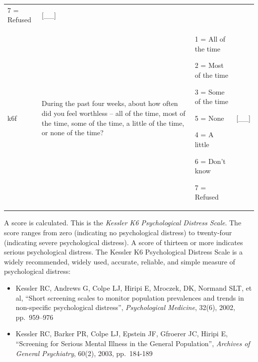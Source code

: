 \documentclass[12pt,a4paper]{book}
\theoremstyle{definition}
\theoremstyle{definition}
\theoremstyle{definition}
\theoremstyle{remark}
\begin{document}
\begin{longtable}[]{@{}llll@{}}
\begin{minipage}[t]{0.24\columnwidth}
7 = Refused\strut
\end{minipage} & \begin{minipage}[t]{0.24\columnwidth}\raggedright
{[}\_\_{]}\strut
\end{minipage}\tabularnewline
\begin{minipage}[t]{0.24\columnwidth}\raggedright
k6f\strut
\end{minipage} & \begin{minipage}[t]{0.24\columnwidth}\raggedright
During the past four weeks, about how often did you feel worthless --
all of the time, most of the time, some of the time, a little of the
time, or none of the time?\strut
\end{minipage} & \begin{minipage}[t]{0.24\columnwidth}\raggedright
1 = All of the time

2 = Most of the time

3 = Some of the time

5 = None

4 = A little

6 = Don't know

7 = Refused\strut
\end{minipage} & \begin{minipage}[t]{0.24\columnwidth}\raggedright
{[}\_\_{]}\strut
\end{minipage}\tabularnewline
\bottomrule
\end{longtable}

A score is calculated. This is the \emph{Kessler K6 Psychological
Distress Scale}. The score ranges from zero (indicating no psychological
distress) to twenty-four (indicating severe psychological distress). A
score of thirteen or more indicates serious psychological distress. The
Kessler K6 Psychological Distress Scale is a widely recommended, widely
used, accurate, reliable, and simple measure of psychological distress:

\begin{itemize}
\item
  Kessler RC, Andrews G, Colpe LJ, Hiripi E, Mroczek, DK, Normand SLT,
  et al, ``Short screening scales to monitor population prevalences and
  trends in non-specific psychological distress'', \emph{Psychological
  Medicine}, 32(6), 2002, pp.~959--976
\item
  Kessler RC, Barker PR, Colpe LJ, Epstein JF, Gfroerer JC, Hiripi E,
  ``Screening for Serious Mental Illness in the General Population'',
  \emph{Archives of General Psychiatry}, 60(2), 2003, pp.~184-189
\end{itemize}
\end{document}
